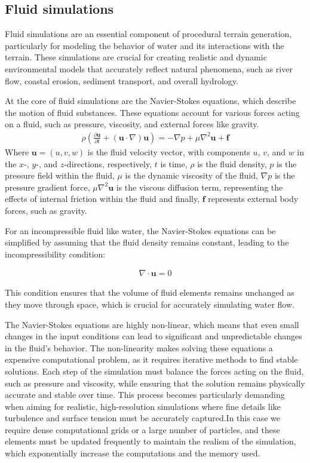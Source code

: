 \subsection{Fluid simulations}
Fluid simulations are an essential component of procedural terrain generation, particularly for modeling the behavior of water and its interactions with the terrain. These simulations are crucial for creating realistic and dynamic environmental models that accurately reflect natural phenomena, such as river flow, coastal erosion, sediment transport, and overall hydrology.

At the core of fluid simulations are the Navier-Stokes equations, which describe the motion of fluid substances. These equations account for various forces acting on a fluid, such as pressure, viscosity, and external forces like gravity. 
\begin{align}
    \rho \left( \frac{\partial \mathbf{u}}{\partial t} + (\mathbf{u} \cdot \nabla) \mathbf{u} \right) = -\nabla p + \mu \nabla^2 \mathbf{u} + \mathbf{f}
\end{align}
Where $\mathbf{u} = (u, v, w)$ is the fluid velocity vector, with components $u$, $v$, and $w$ in the $x$-, $y$-, and $z$-directions, respectively, $t$ is time, $\rho$ is the fluid density, $p$ is the pressure field within the fluid, $\mu$ is the dynamic viscosity of the fluid, $\nabla p$ is the pressure gradient force, $\mu \nabla^2 \mathbf{u}$ is the viscous diffusion term, representing the effects of internal friction within the fluid and finally, $\mathbf{f}$ represents external body forces, such as gravity.

For an incompressible fluid like water, the Navier-Stokes equations can be simplified by assuming that the fluid density remains constant, leading to the incompressibility condition:

\begin{align}
    \nabla \cdot \mathbf{u} = 0
\end{align}

This condition ensures that the volume of fluid elements remains unchanged as they move through space, which is crucial for accurately simulating water flow.

The Navier-Stokes equations are highly non-linear, which means that even small changes in the input conditions can lead to significant and unpredictable changes in the fluid's behavior. The non-linearity makes solving these equations a expensive computational problem, as it requires iterative methods to find stable solutions. Each step of the simulation must balance the forces acting on the fluid, such as pressure and viscosity, while ensuring that the solution remains physically accurate and stable over time. This process becomes particularly demanding when aiming for realistic, high-resolution simulations where fine details like turbulence and surface tension must be accurately captured.In this case we require dense computational grids or a large number of particles, and these elements must be updated frequently to maintain the realism of the simulation, which exponentially increase the computations and the memory used.

